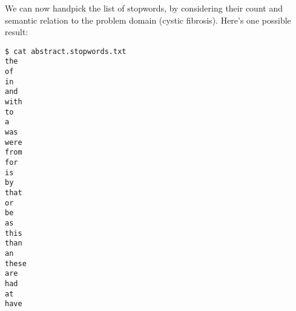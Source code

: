 We can now handpick the list of stopwords, by considering their count and
semantic relation to the problem domain (cystic fibrosis). Here's one possible
result:

\begin{lstlisting}
$ cat abstract.stopwords.txt 
the
of
in
and
with
to
a
was
were
from
for
is
by
that
or
be
as
this
than
an
these
are
had
at
have
\end{lstlisting}

